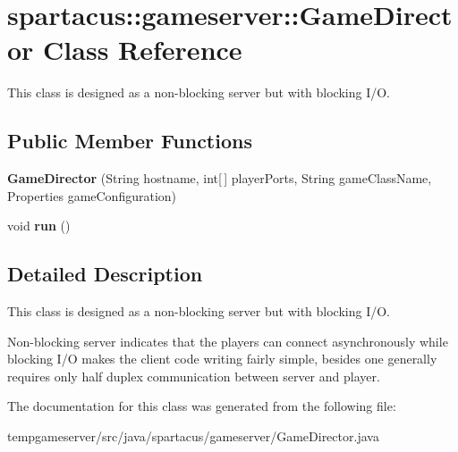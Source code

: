 \hypertarget{classspartacus_1_1gameserver_1_1GameDirector}{
\section{\-s\-p\-a\-r\-t\-a\-c\-u\-s\-:\-:\-g\-a\-m\-e\-s\-e\-r\-v\-e\-r\-:\-:\-G\-a\-m\-e\-D\-i\-r\-e\-c\-t\-o\-r \-C\-l\-a\-s\-s \-R\-e\-f\-e\-r\-e\-n\-c\-e}
\label{classspartacus_1_1gameserver_1_1GameDirector}
}


This class is designed as a non-\/blocking server but with blocking I/O.  


\subsection*{Public Member Functions}
\begin{DoxyCompactItemize}
\item 
\hypertarget{classspartacus_1_1gameserver_1_1GameDirector_ab38b0c8e84a89c09c36f1c5298cf648e}{
{\bfseries \-G\-a\-m\-e\-D\-i\-r\-e\-c\-t\-o\-r} \-(\-S\-t\-r\-i\-n\-g \-h\-o\-s\-t\-n\-a\-m\-e, \-i\-n\-t\mbox{[}$\,$\mbox{]} \-p\-l\-a\-y\-e\-r\-P\-o\-r\-t\-s, \-S\-t\-r\-i\-n\-g \-g\-a\-m\-e\-C\-l\-a\-s\-s\-N\-a\-m\-e, \-P\-r\-o\-p\-e\-r\-t\-i\-e\-s \-g\-a\-m\-e\-C\-o\-n\-f\-i\-g\-u\-r\-a\-t\-i\-o\-n\-)}
\label{classspartacus_1_1gameserver_1_1GameDirector_ab38b0c8e84a89c09c36f1c5298cf648e}

\item 
\hypertarget{classspartacus_1_1gameserver_1_1GameDirector_abbf3c7ebc5e86bf328e1e30a937dc342}{
\-v\-o\-i\-d {\bfseries \-r\-u\-n} \-(\-)}
\label{classspartacus_1_1gameserver_1_1GameDirector_abbf3c7ebc5e86bf328e1e30a937dc342}

\end{DoxyCompactItemize}


\subsection{Detailed Description}
This class is designed as a non-\/blocking server but with blocking I/O. 

Non-\/blocking server indicates that the players can connect asynchronously while blocking I/O makes the client code writing fairly simple, besides one generally requires only half duplex communication between server and player. 

The documentation for this class was generated from the following file:\begin{DoxyCompactItemize}
\item 
\-t\-e\-m\-p\-g\-a\-m\-e\-s\-e\-r\-v\-e\-r\-/\-s\-r\-c\-/\-j\-a\-v\-a\-/\-s\-p\-a\-r\-t\-a\-c\-u\-s\-/\-g\-a\-m\-e\-s\-e\-r\-v\-e\-r\-/\-G\-a\-m\-e\-D\-i\-r\-e\-c\-t\-o\-r\-.\-j\-a\-v\-a\end{DoxyCompactItemize}
